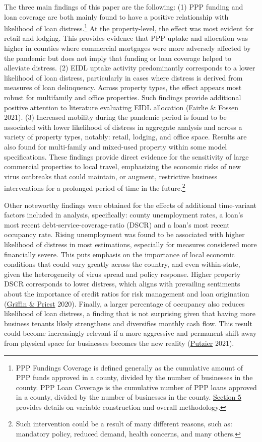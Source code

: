 \documentclass[11pt]{article} %
\begin{document}
The three main findings of this paper are the following: (1) PPP funding and loan coverage are both mainly found to have a positive relationship with likelihood of loan distress.\footnote{PPP Fundings Coverage is defined generally as the cumulative amount of PPP funds approved in a county, divided by the number of businesses in the county. PPP Loan Coverage is the cumulative number of PPP loans approved in a county, divided by the number of businesses in the county. \hyperlink{Methodology}{Section 5} provides details on variable construction and overall methodology.} At the property-level, the effect was most evident for retail and lodging. This provides evidence that PPP uptake and allocation was higher in counties where commercial mortgages were more adversely affected by the pandemic but does not imply that funding or loan coverage helped to alleviate distress. (2) EIDL uptake activity predominantly corresponds to a lower likelihood of loan distress, particularly in cases where distress is derived from measures of loan delinquency. Across property types, the effect appears most robust for multifamily and office properties. Such findings provide additional positive attention to literature evaluating EIDL allocation (\hyperlink{Fairlie}{Fairlie \& Fossen} 2021). (3) Increased mobility during the pandemic period is found to be associated with lower likelihood of distress in aggregate analysis and across a variety of property types, notably: retail, lodging, and office space. Results are also found for multi-family and mixed-used property within some model specifications. These findings provide direct evidence for the sensitivity of large commercial properties to local travel, emphasizing the economic risks of new virus outbreaks that could maintain, or augment, restrictive business interventions for a prolonged period of time in the future.\footnote{Such intervention could be a result of many different reasons, such as: mandatory policy, reduced demand, health concerns, and many others.}   

Other noteworthy findings were obtained for the effects of additional time-variant factors included in analysis, specifically: county unemployment rates, a loan's most recent debt-service-coverage-ratio (DSCR) and a loan's most recent occupancy rate. Rising unemployment was found to be associated with higher likelihood of distress in most estimations, especially for measures considered more financially severe. This puts emphasis on the importance of local economic conditions that could vary greatly across the country, and even within-state, given the heterogeneity of virus spread and policy response. Higher property DSCR corresponds to lower distress, which aligns with prevailing sentiments about the importance of credit ratios for risk management and loan origination (\hyperlink{Griffin}{Griffin \& Priest} 2020). Finally, a larger percentage of occupancy also reduces likelihood of loan distress, a finding that is not surprising given that having more business tenants likely strengthens and diversifies monthly cash flow. This result could become increasingly relevant if a more aggressive and permanent shift away from physical space for businesses becomes the new reality (\hyperlink{Putzier}{Putzier} 2021).  
\end{document}
